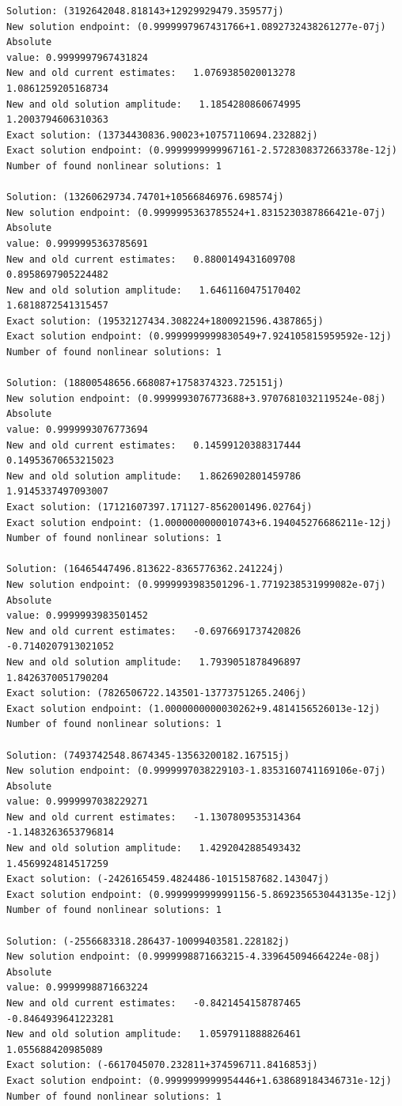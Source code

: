 \documentclass[11pt]{article}
\begin{document}
\begin{Verbatim}[commandchars=\\\{\}]
Solution: (3192642048.818143+12929929479.359577j)
New solution endpoint: (0.9999997967431766+1.0892732438261277e-07j) Absolute
value: 0.9999997967431824
New and old current estimates:   1.0769385020013278    1.0861259205168734
New and old solution amplitude:   1.1854280860674995    1.2003794606310363
Exact solution: (13734430836.90023+10757110694.232882j)
Exact solution endpoint: (0.9999999999967161-2.5728308372663378e-12j)
Number of found nonlinear solutions: 1

Solution: (13260629734.74701+10566846976.698574j)
New solution endpoint: (0.9999995363785524+1.8315230387866421e-07j) Absolute
value: 0.9999995363785691
New and old current estimates:   0.8800149431609708    0.8958697905224482
New and old solution amplitude:   1.6461160475170402    1.6818872541315457
Exact solution: (19532127434.308224+1800921596.4387865j)
Exact solution endpoint: (0.9999999999830549+7.924105815959592e-12j)
Number of found nonlinear solutions: 1

Solution: (18800548656.668087+1758374323.725151j)
New solution endpoint: (0.9999993076773688+3.9707681032119524e-08j) Absolute
value: 0.9999993076773694
New and old current estimates:   0.14599120388317444    0.14953670653215023
New and old solution amplitude:   1.8626902801459786    1.9145337497093007
Exact solution: (17121607397.171127-8562001496.02764j)
Exact solution endpoint: (1.0000000000010743+6.194045276686211e-12j)
Number of found nonlinear solutions: 1

Solution: (16465447496.813622-8365776362.241224j)
New solution endpoint: (0.9999993983501296-1.7719238531999082e-07j) Absolute
value: 0.9999993983501452
New and old current estimates:   -0.6976691737420826    -0.7140207913021052
New and old solution amplitude:   1.7939051878496897    1.8426370051790204
Exact solution: (7826506722.143501-13773751265.2406j)
Exact solution endpoint: (1.0000000000030262+9.4814156526013e-12j)
Number of found nonlinear solutions: 1

Solution: (7493742548.8674345-13563200182.167515j)
New solution endpoint: (0.9999997038229103-1.8353160741169106e-07j) Absolute
value: 0.9999997038229271
New and old current estimates:   -1.1307809535314364    -1.1483263653796814
New and old solution amplitude:   1.4292042885493432    1.4569924814517259
Exact solution: (-2426165459.4824486-10151587682.143047j)
Exact solution endpoint: (0.9999999999991156-5.8692356530443135e-12j)
Number of found nonlinear solutions: 1

Solution: (-2556683318.286437-10099403581.228182j)
New solution endpoint: (0.9999998871663215-4.339645094664224e-08j) Absolute
value: 0.9999998871663224
New and old current estimates:   -0.8421454158787465    -0.8464939641223281
New and old solution amplitude:   1.0597911888826461    1.055688420985089
Exact solution: (-6617045070.232811+374596711.8416853j)
Exact solution endpoint: (0.9999999999954446+1.638689184346731e-12j)
Number of found nonlinear solutions: 1


\end{Verbatim}
\end{document}
